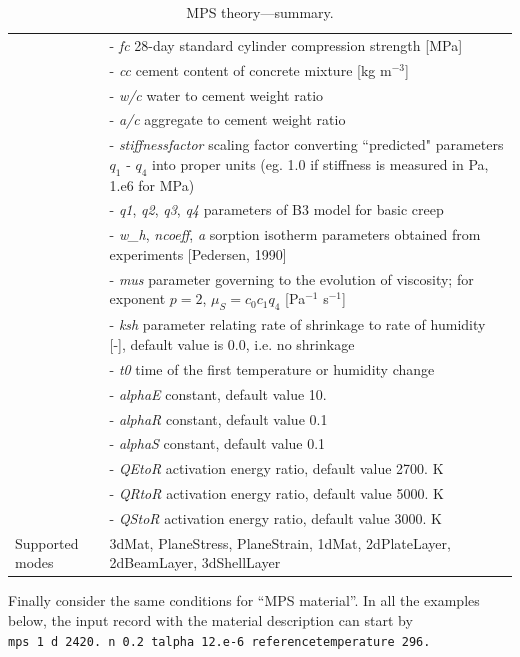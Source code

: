 \documentclass[a4paper]{article}
\newcommand{\param}[1]{{\it #1}}
\begin{document}
\begin{table}[!htb]
\begin{tabular}{|l|p{9cm}|}
\hline
%
&- \param{fc} 28-day standard cylinder compression strength [MPa]\\
&- \param{cc} cement content of concrete mixture  [kg m$^{-3}$] \\
&- \param{w/c} water to cement weight ratio\\
&- \param{a/c} aggregate to cement weight ratio\\
&- \param{stiffnessfactor} scaling factor converting ``predicted" parameters $q_1$ - $q_4$ into proper units (eg. 1.0 if stiffness is measured in Pa, 1.e6 for MPa)\\
&- \param{q1}, \param{q2}, \param{q3}, \param{q4} parameters of B3 model for basic creep\\
&- \param{w\_h}, \param{ncoeff}, \param{a} sorption isotherm parameters obtained from experiments [Pedersen, 1990] \\
%
&- \param{mus} parameter governing to the evolution of viscosity; for exponent $p=2$, $\mu_S = c_0 c_1 q_4$ [Pa$^{-1}$ s$^{-1}$] \\
&- \param{ksh} parameter relating rate of shrinkage to rate of humidity [-], default value is 0.0, i.e. no shrinkage\\
&- \param{t0} time of the first temperature or humidity change\\
&- \param{alphaE} constant, default value 10.\\
&- \param{alphaR} constant, default value 0.1\\
&- \param{alphaS} constant, default value 0.1\\
&- \param{QEtoR} activation energy ratio, default value 2700. K\\
&- \param{QRtoR} activation energy ratio, default value 5000. K\\
&- \param{QStoR} activation energy ratio, default value 3000. K\\
%
Supported modes& 3dMat, PlaneStress, PlaneStrain, 1dMat,
2dPlateLayer, 2dBeamLayer, 3dShellLayer\\
\hline
\end{tabular}

\caption{MPS theory---summary.}
\label{mps_table}

\end{table}


Finally consider the same conditions for ``MPS material''.
In all the examples below,
the input record with the material description can start by\\
{\tt mps 1 d 2420. n 0.2 talpha 12.e-6 referencetemperature 296.}
\end{document}

